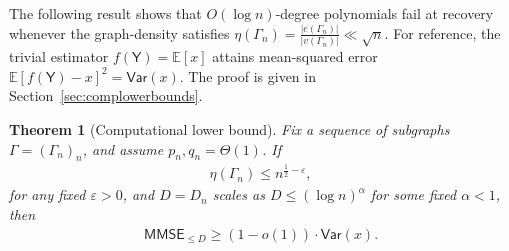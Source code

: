 \documentclass[12pt]{article}
\newcommand{\bE}{\mathbb{E}}
\newtheorem{theorem}{Theorem}
\newcommand{\s}[1]{\mathsf{#1}}
\begin{document}
The following result shows that $O(\log n)$-degree polynomials fail at recovery whenever the graph-density satisfies $\eta(\Gamma_n)=\frac{|e(\Gamma_n)|}{|v(\Gamma_n)|}\ll\sqrt{n}$. For reference, the trivial estimator $f(\s{Y})=\bE[x]$ attains mean-squared error $\bE[f(\s{Y})-x]^2=\s{Var}(x)$. The proof is given in Section~\ref{sec:complowerbounds}.
\begin{theorem}[Computational lower bound]\label{thm:compLower}
Fix a sequence of subgraphs $\Gamma=(\Gamma_n)_n$, and assume $p_n,q_n=\Theta(1)$. If 
\begin{align}
    \eta(\Gamma_n) \leq n^{\frac{1}{2}-\varepsilon},
\end{align}
for any fixed $\varepsilon>0$, and $D=D_n$ scales as $D\leq(\log n)^{\alpha}$ for some fixed $\alpha<1$, then
\begin{align}
    \s{MMSE}_{\leq D}\geq (1-o(1))\cdot\s{Var}(x).
\end{align}
\end{theorem}
\end{document}
